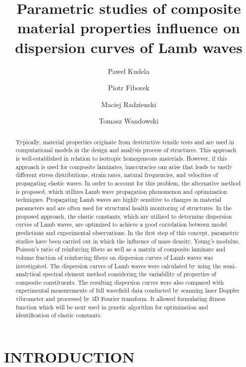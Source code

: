 \documentclass[]{spie}  %
\title{Parametric studies of composite material properties influence on dispersion 
curves of Lamb waves}
\author[a]{Pawel Kudela}
\author[a]{Piotr Fiborek}
\author[a]{Maciej Radzienski}
\author[a]{Tomasz Wandowski}
\affil[a]{Institute of Fluid-Flow Machinery, Polish Academy of Sciences, Fiszera 14 St, 
80-231 Gdansk, Poland}
\begin{document}
 
\maketitle

\begin{abstract}
Typically, material properties originate from destructive tensile tests and are used in 
computational models in the design and analysis process of structures. 
This approach is well-established in relation to isotropic homogeneous materials. 
However, if this approach is used for composite laminates, inaccuracies can arise that 
leads to vastly different stress distributions, strain rates, natural frequencies, and 
velocities of propagating elastic waves. In order to account for this problem, the 
alternative method is proposed, which utilizes Lamb wave propagation phenomenon 
and optimization techniques. 
Propagating Lamb waves are highly sensitive to changes in material parameters and 
are often used for structural health monitoring of structures. In the proposed approach, 
the elastic constants, which are utilized to determine dispersion curves of Lamb waves, 
are optimized to achieve a good correlation between model predictions and 
experimental observations. 
In the first step of this concept, parametric studies have been carried out in which the 
influence of mass density, Young’s modulus, Poisson’s ratio of reinforcing fibers as 
well as a matrix of composite laminate and volume fraction of reinforcing fibers on 
dispersion curves of Lamb waves was investigated. 
The dispersion curves of Lamb waves were calculated by using the semi-analytical 
spectral element method considering the variability of properties of composite 
constituents. 
The resulting dispersion curves were also compared with experimental measurements 
of full wavefield data conducted by scanning laser Doppler vibrometer and processed 
by 3D Fourier transform. It allowed formulating fitness function which will be next used 
in genetic algorithm for optimization and identification of elastic constants.
\end{abstract}


\section{INTRODUCTION}
\label{sec:intro}  %
\end{document}
